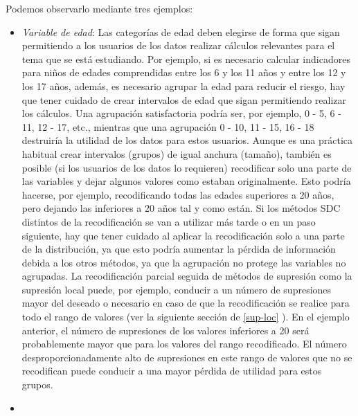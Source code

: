 \documentclass[]{book}
\theoremstyle{definition}
\theoremstyle{definition}
\theoremstyle{definition}
\theoremstyle{definition}
\theoremstyle{remark}
\begin{document}
Podemos observarlo mediante tres ejemplos:

\begin{itemize}
\item
  \emph{Variable de edad}: Las categorías de edad deben elegirse de forma que sigan permitiendo a los usuarios de los datos realizar cálculos relevantes para el tema que se está estudiando. Por ejemplo, si es necesario calcular indicadores para niños de edades comprendidas entre los 6 y los 11 años y entre los 12 y los 17 años, además, es necesario agrupar la edad para reducir el riesgo, hay que tener cuidado de crear intervalos de edad que sigan permitiendo realizar los cálculos. Una agrupación satisfactoria podría ser, por ejemplo, 0 - 5, 6 - 11, 12 - 17, etc., mientras que una agrupación 0 - 10, 11 - 15, 16 - 18 destruiría la utilidad de los datos para estos usuarios. Aunque es una práctica habitual crear intervalos (grupos) de igual anchura (tamaño), también es posible (si los usuarios de los datos lo requieren) recodificar solo una parte de las variables y dejar algunos valores como estaban originalmente. Esto podría hacerse, por ejemplo, recodificando todas las edades superiores a 20 años, pero dejando las inferiores a 20 años tal y como están. Si los métodos SDC distintos de la recodificación se van a utilizar más tarde o en un paso siguiente, hay que tener cuidado al aplicar la recodificación solo a una parte de la distribución, ya que esto podría aumentar la pérdida de información debida a los otros métodos, ya que la agrupación no protege las variables no agrupadas. La recodificación parcial seguida de métodos de supresión como la supresión local puede, por ejemplo, conducir a un número de supresiones mayor del deseado o necesario en caso de que la recodificación se realice para todo el rango de valores (ver la siguiente sección de \ref{sup-loc} ). En el ejemplo anterior, el número de supresiones de los valores inferiores a 20 será probablemente mayor que para los valores del rango recodificado. El número desproporcionadamente alto de supresiones en este rango de valores que no se recodifican puede conducir a una mayor pérdida de utilidad para estos grupos.
\item

\end{itemize}
\end{document}
